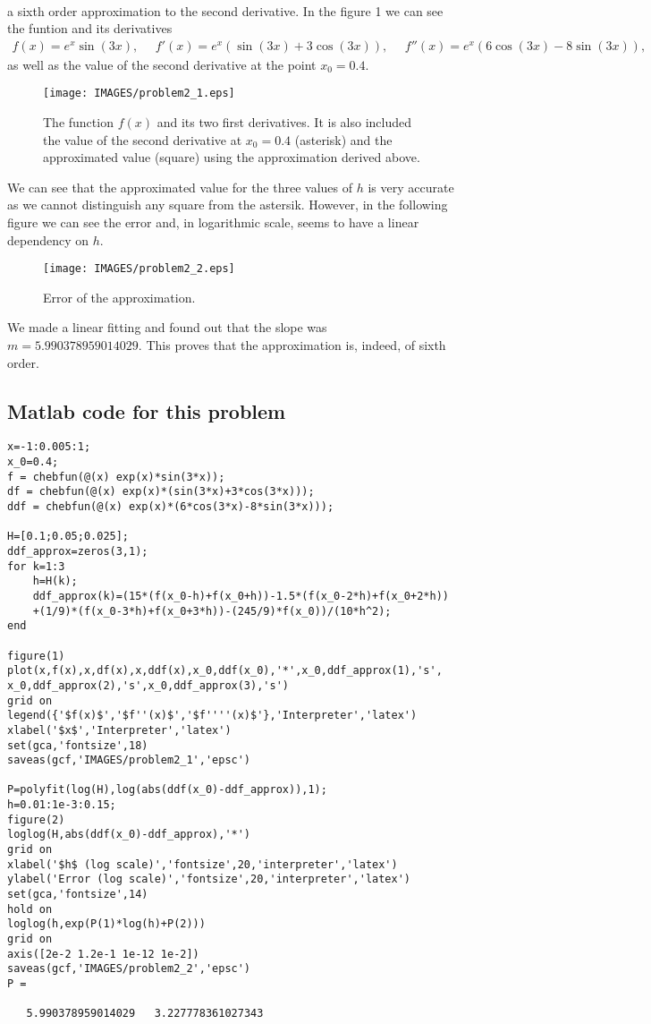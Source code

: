 \begin{solution}
\begin{align*}
\end{align*}
a sixth order approximation to the second derivative.
In the figure 1 we can see the funtion and its derivatives
\begin{align*}
f(x)=e^x\sin{(3x)},~~~~~~f'(x)=e^x\left(\sin{(3x)}+3\cos{(3x)}\right),~~~~~~f''(x)=e^x\left(6\cos{(3x)}-8\sin{(3x)}\right),
\end{align*}
as well as the value of the second derivative at the point $x_0=0.4$.
\begin{figure}[H]
\centering     %
\texttt{[image: IMAGES/problem2\_1.eps]}\caption{The function $f(x)$ and its two first derivatives. It is also included the value of the second derivative at $x_0=0.4$ (asterisk) and the approximated value (square) using the approximation derived above.}
\end{figure}
We can see that the approximated value for the three values of $h$ is very accurate as we cannot distinguish any square from the astersik. However, in the following figure we can see the error and, in logarithmic scale, seems to have a linear dependency on $h$. 
\begin{figure}[H]
\centering     %
{\texttt{[image: IMAGES/problem2\_2.eps]}}
\caption{Error of the approximation.}
\end{figure}
We made a linear fitting and found out that the slope was $m=5.990378959014029$. This proves that the approximation is, indeed, of sixth order.
\subsection*{Matlab code for this problem}
\begin{verbatim}
x=-1:0.005:1;
x_0=0.4;
f = chebfun(@(x) exp(x)*sin(3*x));
df = chebfun(@(x) exp(x)*(sin(3*x)+3*cos(3*x)));
ddf = chebfun(@(x) exp(x)*(6*cos(3*x)-8*sin(3*x)));

H=[0.1;0.05;0.025];
ddf_approx=zeros(3,1);
for k=1:3
    h=H(k);
    ddf_approx(k)=(15*(f(x_0-h)+f(x_0+h))-1.5*(f(x_0-2*h)+f(x_0+2*h))
    +(1/9)*(f(x_0-3*h)+f(x_0+3*h))-(245/9)*f(x_0))/(10*h^2);
end

figure(1)
plot(x,f(x),x,df(x),x,ddf(x),x_0,ddf(x_0),'*',x_0,ddf_approx(1),'s',
x_0,ddf_approx(2),'s',x_0,ddf_approx(3),'s')
grid on
legend({'$f(x)$','$f''(x)$','$f''''(x)$'},'Interpreter','latex')
xlabel('$x$','Interpreter','latex')
set(gca,'fontsize',18)
saveas(gcf,'IMAGES/problem2_1','epsc')

P=polyfit(log(H),log(abs(ddf(x_0)-ddf_approx)),1);
h=0.01:1e-3:0.15;
figure(2)
loglog(H,abs(ddf(x_0)-ddf_approx),'*')
grid on
xlabel('$h$ (log scale)','fontsize',20,'interpreter','latex')
ylabel('Error (log scale)','fontsize',20,'interpreter','latex')
set(gca,'fontsize',14)
hold on
loglog(h,exp(P(1)*log(h)+P(2)))
grid on
axis([2e-2 1.2e-1 1e-12 1e-2])
saveas(gcf,'IMAGES/problem2_2','epsc')
P =

   5.990378959014029   3.227778361027343

\end{verbatim}
\end{solution}
